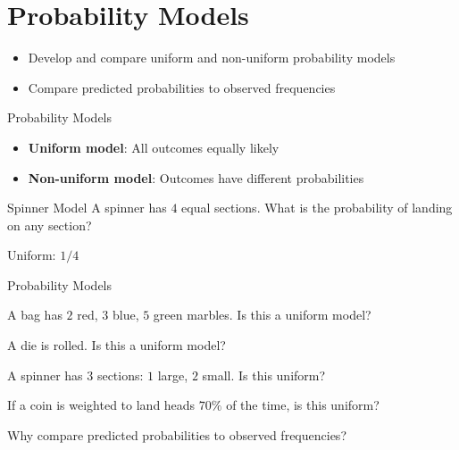 \section{Probability Models}

\begin{learningGoals}
\begin{itemize}
    \item Develop and compare uniform and non-uniform probability models
    \item Compare predicted probabilities to observed frequencies
\end{itemize}
\end{learningGoals}

\begin{conceptBox}{Probability Models}
\begin{itemize}[leftmargin=*]
    \item \textbf{Uniform model}: All outcomes equally likely
    \item \textbf{Non-uniform model}: Outcomes have different probabilities
\end{itemize}
\end{conceptBox}

\begin{workedExample}{Spinner Model}
A spinner has $4$ equal sections. What is the probability of landing on any section?

Uniform: $1/4$
\end{workedExample}


\begin{practiceBox}{Probability Models}
\resetProblems

\prob A bag has $2$ red, $3$ blue, $5$ green marbles. Is this a uniform model?

\prob A die is rolled. Is this a uniform model?

\prob A spinner has $3$ sections: $1$ large, $2$ small. Is this uniform?

\prob If a coin is weighted to land heads $70\%$ of the time, is this uniform?

\prob Why compare predicted probabilities to observed frequencies?

\end{practiceBox}
